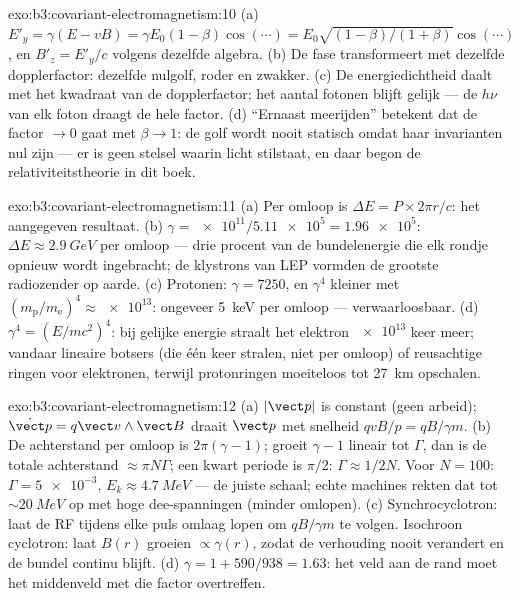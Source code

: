 \begin{solution}{exo:b3:covariant-electromagnetism:10}
(a) $E'_y = \gamma(E - vB) = \gamma E_0(1 - \beta)\cos(\cdots) =
E_0\sqrt{(1-\beta)/(1+\beta)}\cos(\cdots)$, en $B'_z = E'_y/c$ volgens
dezelfde algebra. (b) De fase transformeert met dezelfde dopplerfactor:
dezelfde nulgolf, roder en zwakker. (c) De energiedichtheid daalt met het
kwadraat van de dopplerfactor; het aantal fotonen blijft gelijk --- de
$h\nu$ van elk foton draagt de hele factor. (d) ``Ernaast meerijden''
betekent dat de factor $\to 0$ gaat met $\beta \to 1$: de golf wordt
nooit statisch omdat haar invarianten nul zijn --- er is geen stelsel
waarin licht stilstaat, en daar begon de relativiteitstheorie in dit boek.
\end{solution}

\begin{solution}{exo:b3:covariant-electromagnetism:11}
(a) Per omloop is $\Delta E = P \times 2\pi r/c$: het aangegeven
resultaat. (b) $\gamma = \num{e11}/\num{5.11e5} = \num{1.96e5}$: $\Delta E \approx
\qty{2.9}{GeV}$ per omloop --- drie procent van de
bundelenergie die elk rondje opnieuw wordt ingebracht; de klystrons van
LEP vormden de grootste radiozender op aarde. (c) Protonen: $\gamma = 7250$, en $\gamma^4$ kleiner met $(m_{\text{p}}/m_{\text{e}})^4 \approx \num{e13}$: ongeveer \qty{5}{keV} per omloop --- verwaarloosbaar. (d)
$\gamma^4 = (E/mc^2)^4$: bij gelijke energie straalt het elektron
$\num{e13}$ keer meer; vandaar lineaire botsers (die één keer stralen, niet
per omloop) of reusachtige ringen voor elektronen, terwijl protonringen
moeiteloos tot \qty{27}{km} opschalen.
\end{solution}

\begin{solution}{exo:b3:covariant-electromagnetism:12}
(a) $|\vect p|$ is constant (geen arbeid); $\dot{\vect p} = q\vect
v\wedge\vect B$ draait $\vect p$ met snelheid $qvB/p = qB/\gamma m$. (b)
De achterstand per omloop is $2\pi(\gamma - 1)$; groeit $\gamma - 1$
lineair tot $\Gamma$, dan is de totale achterstand $\approx \pi N\Gamma$;
een kwart periode is $\pi/2$: $\Gamma \approx 1/2N$. Voor $N = 100$:
$\Gamma =
\num{5e-3}$, $E_k \approx \qty{4.7}{MeV}$ --- de juiste schaal;
echte machines rekten dat tot $\sim\qty{20}{MeV}$ op met hoge
dee-spanningen (minder omlopen). (c) Synchrocyclotron: laat de RF tijdens
elke puls omlaag lopen om $qB/\gamma m$ te volgen. Isochroon cyclotron:
laat $B(r)$ groeien $\propto\gamma(r)$, zodat de verhouding nooit
verandert en de bundel continu blijft. (d) $\gamma = 1 + 590/938 = 1.63$:
het veld aan de rand moet het middenveld met die factor overtreffen.
\end{solution}

